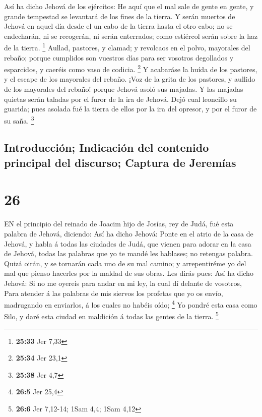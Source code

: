  Así ha dicho Jehová de los ejércitos: He aquí que el mal
sale de gente en gente, y grande tempestad se levantará de los fines de
la tierra.  Y serán muertos de Jehová en aquel día desde el
un cabo de la tierra hasta el otro cabo; no se endecharán, ni se
recogerán, ni serán enterrados; como estiércol serán sobre la haz de la
tierra. \footnote{\textbf{25:33} Jer 7,33}  Aullad,
pastores, y clamad; y revolcaos en el polvo, mayorales del rebaño;
porque cumplidos son vuestros días para ser vosotros degollados y
esparcidos, y caeréis como vaso de codicia. \footnote{\textbf{25:34} Jer
  23,1}  Y acabaráse la huída de los pastores, y el escape
de los mayorales del rebaño.  ¡Voz de la grita de los
pastores, y aullido de los mayorales del rebaño! porque Jehová asoló sus
majadas.  Y las majadas quietas serán taladas por el furor
de la ira de Jehová.  Dejó cual leoncillo su guarida; pues
asolada fué la tierra de ellos por la ira del opresor, y por el furor de
su saña. \footnote{\textbf{25:38} Jer 4,7}

\hypertarget{introducciuxf3n-indicaciuxf3n-del-contenido-principal-del-discurso-captura-de-jeremuxedas}{%
\subsection{Introducción; Indicación del contenido principal del
discurso; Captura de
Jeremías}\label{introducciuxf3n-indicaciuxf3n-del-contenido-principal-del-discurso-captura-de-jeremuxedas}}

\hypertarget{section-25}{%
\section{26}\label{section-25}}

 EN el principio del reinado de Joacim hijo de Josías, rey
de Judá, fué esta palabra de Jehová, diciendo:  Así ha dicho
Jehová: Ponte en el atrio de la casa de Jehová, y habla á todas las
ciudades de Judá, que vienen para adorar en la casa de Jehová, todas las
palabras que yo te mandé les hablases; no retengas palabra. 
Quizá oirán, y se tornarán cada uno de su mal camino; y arrepentiréme yo
del mal que pienso hacerles por la maldad de sus obras.  Les
dirás pues: Así ha dicho Jehová: Si no me oyereis para andar en mi ley,
la cual dí delante de vosotros,  Para atender á las palabras
de mis siervos los profetas que yo os envío, madrugando en enviarlos, á
los cuales no habéis oído; \footnote{\textbf{26:5} Jer 25,4}
 Yo pondré esta casa como Silo, y daré esta ciudad en
maldición á todas las gentes de la tierra. \footnote{\textbf{26:6} Jer
  7,12-14; 1Sam 4,4; 1Sam 4,12}


